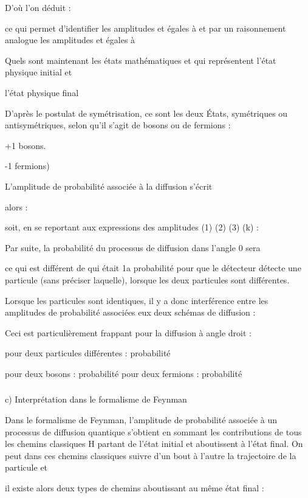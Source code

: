{{{D'où l'on déduit :

ce qui permet d'identifier les amplitudes  et  égales à
 et par un raisonnement analogue les amplitudes  et 
égales à 

Quels sont maintenant les états mathématiques 
et qui représentent l'état physique initial  et

l'état physique final 

D'après le postulat de symétrisation, ce sont les deux
États, symétriques ou antisymétriques, selon qu'il s'agit de bosons
ou de fermions :

+1 bosons.

-1 fermions)


L'amplitude de probabilité associée à la diffusion s'écrit

alors :

soit, en se reportant aux expressions des amplitudes (1) (2) (3) (k) :

Par suite, la probabilité du processus de diffusion dans l'angle 0 sera

ce qui est différent de  qui était 1a probabilité pour que le détecteur détecte
une particule (sans préciser laquelle),
lorsque les deux particules sont différentes.

Lorsque les particules sont identiques, il y a donc interférence entre les
amplitudes de probabilité associées eux deux schémas
de diffusion :


Ceci est particulièrement frappant pour la diffusion à angle
droit  :

pour deux particules différentes : probabilité

pour deux bosons : probabilité
pour deux fermions : probabilité

\subsubsection{}%
c) Interprétation dans le formalisme de Feynman

Dans le formalisme de Feynman, l'amplitude de probabilité
associée à un processus de diffusion quantique s'obtient en sommant
les contributions de tous les chemins classiques H partant de l'état
initial et aboutissent à l'état final. On peut dans ces chemins classiques
suivre d'un bout à l'autre la trajectoire de la particule et

il existe alors deux types de chemins aboutissant au même état final :

}}}
